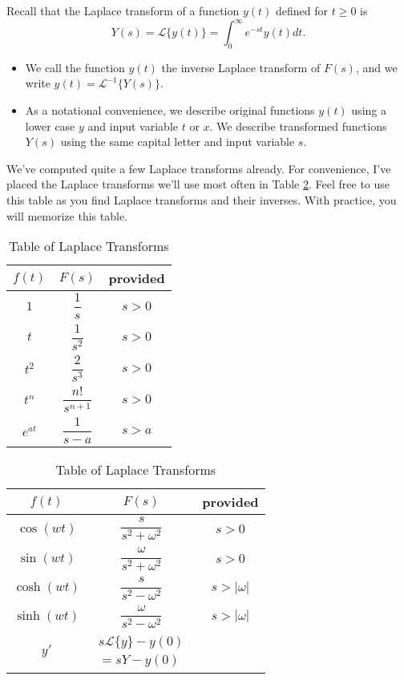 Recall that the Laplace transform of a function $y(t)$ defined for $t\geq 0$ is $$Y(s)=\mathscr{L}\{y(t)\}=\int_0^\infty e^{-st}y(t)dt.$$ 
\begin{itemize}
 \item We call the function $y(t)$ the inverse Laplace transform of $F(s)$, and we write $y(t)=\mathscr{L}^{-1}\{Y(s)\}$. 
 \item As a notational convenience, we describe original functions $y(t)$ using a lower case $y$ and input variable $t$ or $x$. 
 We describe transformed functions $Y(s)$ using the same capital letter and input variable $s$.
\end{itemize}
We've computed quite a few Laplace transforms already.  For convenience, I've placed the Laplace transforms we'll use most often in Table \ref{laplacetable}. Feel free to use this table as you find Laplace transforms and their inverses.  With practice, you will memorize this table.
\begin{table}
\begin{center}
\begin{tabular}[t]{|c|cc|}
\hline
$f(t)$ & $F(s)$ & provided\\
\hline\hline
$1$					&$\dfrac{1}{s}$ 							&$s>0$\\\hline
$t$				&$\dfrac{1}{s^{2}}$ 			&$s>0$\\\hline
$t^2$				&$\dfrac{2}{s^{3}}$ 			&$s>0$\\\hline
$t^n$				&$\dfrac{n!}{s^{n+1}}$ 			&$s>0$\\\hline
$e^{at}$		&$\dfrac{1}{s-a}$ 			&$s>a$\\\hline
\end{tabular}
\quad
\begin{tabular}[t]{|c|cc|}
\hline
$f(t)$ & $F(s)$ & provided\\
\hline\hline
$\cos(wt)$  &$\dfrac{s}{s^2+\omega^2}$ 			&$s>0$\\\hline
$\sin(wt)$  &$\dfrac{\omega}{s^2+\omega^2}$ 			&$s>0$\\\hline
$\cosh(wt)$ &$\dfrac{s}{s^2-\omega^2}$ 			&$s>|\omega|$\\\hline
$\sinh(wt)$ &$\dfrac{\omega}{s^2-\omega^2}$ 			&$s>|\omega|$\\\hline
$y'$					&$\begin{array}{rl}s\mathscr{L}\{y\}-y(0)\\ =sY-y(0)\end{array}$ 						&\\\hline
\end{tabular}

\caption{Table of Laplace Transforms}
\label{laplacetable}
\end{center}
\end{table}

